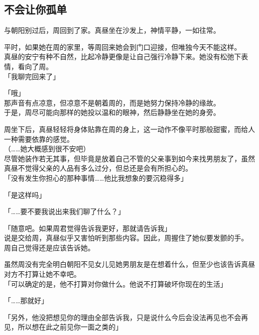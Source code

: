\subsection{不会让你孤单}

与朝阳别过后，周回到了家。真昼坐在沙发上，神情平静，一如往常。

平时，如果她在周的家里，等周回来她会到门口迎接，但唯独今天不能这样。\\

真昼的安宁有种不自然，比起冷静更像是让自己强行冷静下来。她没有松弛下表情，看向了周。\\

「我聊完回来了」

「哦」\\

那声音有点凉意，但凉意不是朝着周的，而是她努力保持冷静的缘故。\\

于是，周尽可能向那样的她投以温和的眼神，然后静静坐在她的身旁。

周坐下后，真昼轻轻将身体贴靠在周的身上，这一动作不像平时那般甜蜜，而给人一种需要依靠的感觉。\\

（……她大概感到很不安吧）\\

尽管她装作若无其事，但毕竟是放着自己不管的父亲事到如今来找男朋友了，虽然真昼不觉得父亲的人品有多么过分，但总还是会有所担心的。\\

「没有发生你担心的那种事情……他比我想象的要沉稳得多」

「是这样吗」

「……要不要我说出来我们聊了什么？」

「随意吧。如果周君觉得告诉我更好，那就请告诉我」\\

说是交给周，真昼似乎又害怕听到那些内容。因此，周握住了她似要发颤的手。\\

周自己觉得还是应该告诉她。

虽然周没有完全明白朝阳不见女儿见她男朋友是在想着什么，但至少也该告诉真昼对方不打算让她不幸吧。\\

「可以确定的是，他不打算对你做什么。他说不打算破坏你现在的生活」

「……那就好」

「另外，他没把想见你的理由全部告诉我，只是说什么今后会没法再见也不会再见，所以想在此之前见你一面之类的」\\

